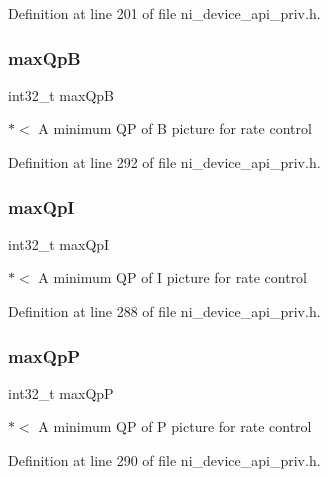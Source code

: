 Definition at line 201 of file ni\+\_\+device\+\_\+api\+\_\+priv.\+h.

\mbox{\label{struct__ni__t408__config__t_a13faeb393a1c1e4aa154405bb5abb059}} 
\subsubsection{\texorpdfstring{maxQpB}{maxQpB}}
{\footnotesize\ttfamily int32\+\_\+t max\+QpB}

$\ast$$<$ A minimum QP of B picture for rate control 

Definition at line 292 of file ni\+\_\+device\+\_\+api\+\_\+priv.\+h.

\mbox{\label{struct__ni__t408__config__t_a874c189279f65854f52101c60f2956fb}} 
\subsubsection{\texorpdfstring{maxQpI}{maxQpI}}
{\footnotesize\ttfamily int32\+\_\+t max\+QpI}

$\ast$$<$ A minimum QP of I picture for rate control 

Definition at line 288 of file ni\+\_\+device\+\_\+api\+\_\+priv.\+h.

\mbox{\label{struct__ni__t408__config__t_aa26ebcac91a981e85d08fca531c2975c}} 
\subsubsection{\texorpdfstring{maxQpP}{maxQpP}}
{\footnotesize\ttfamily int32\+\_\+t max\+QpP}

$\ast$$<$ A minimum QP of P picture for rate control 

Definition at line 290 of file ni\+\_\+device\+\_\+api\+\_\+priv.\+h.

\mbox{\label{struct__ni__t408__config__t_adbcc0c8e422026d9a1d4597b3fc7cfc3}} 
